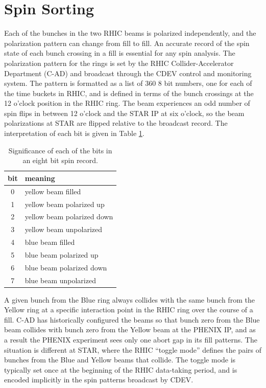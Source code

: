 \section{Spin Sorting}

Each of the bunches in the two RHIC beams is polarized independently, and the polarization pattern can change from fill to fill.  An accurate record of the spin state of each bunch crossing in a fill is essential for any spin analysis.  The polarization pattern for the rings is set by the RHIC Collider-Accelerator Department (C-AD) and broadcast through the CDEV \cite{Barton:2003sh} control and monitoring system.  The pattern is formatted as a list of 360 8 bit numbers, one for each of the time buckets in RHIC, and is defined in terms of the bunch crossings at the 12 o'clock position in the RHIC ring.  The beam experiences an odd number of spin flips in between 12 o'clock and the STAR IP at six o'clock, so the beam polarizations at STAR are flipped relative to the broadcast record.  The interpretation of each bit is given in Table \ref{tbl:spin8}.

\begin{table}
  \begin{center}
    \begin{tabular}{c|l}
      \hline
      bit & meaning \\
      \hline
      \hline
      0 & yellow beam filled\\
      \hline
      1 & yellow beam polarized up\\
      \hline
      2 & yellow beam polarized down\\
      \hline
      3 & yellow beam unpolarized\\
      \hline
      4 & blue beam filled\\
      \hline
      5 & blue beam polarized up\\
      \hline
      6 & blue beam polarized down\\
      \hline
      7 & blue beam unpolarized\\
      \hline
    \end{tabular}
  \end{center}
  \caption{Significance of each of the bits in an eight bit spin record.}
  \label{tbl:spin8}
\end{table}

A given bunch from the Blue ring always collides with the same bunch from the Yellow ring at a specific interaction point in the RHIC ring over the course of a fill.  C-AD has historically configured the beams so that bunch zero from the Blue beam collides with bunch zero from the Yellow beam at the PHENIX IP, and as a result the PHENIX experiment sees only one abort gap in its fill patterns.  The situation is different at STAR, where the RHIC ``toggle mode'' defines the pairs of bunches from the Blue and Yellow beams that collide.  The toggle mode is typically set once at the beginning of the RHIC data-taking period, and is encoded implicitly in the spin patterns broadcast by CDEV.

